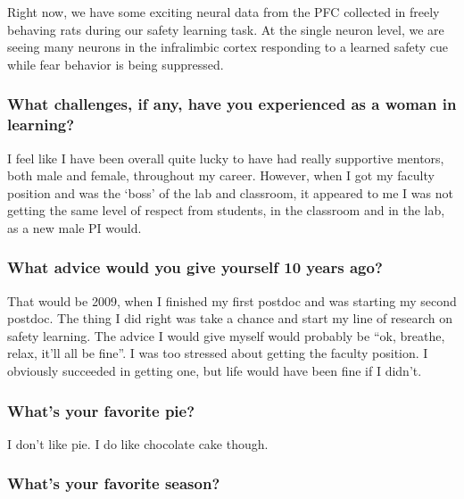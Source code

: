\documentclass[]{article}
\begin{document}
Right now, we have some exciting neural data from the PFC collected in
freely behaving rats during our safety learning task. At the single
neuron level, we are seeing many neurons in the infralimbic cortex
responding to a learned safety cue while fear behavior is being
suppressed.

\subsubsection{\texorpdfstring{\textbf{What challenges, if any, have you
experienced as a woman in
learning?}}{What challenges, if any, have you experienced as a woman in learning?}}\label{what-challenges-if-any-have-you-experienced-as-a-woman-in-learning}

I feel like I have been overall quite lucky to have had really
supportive mentors, both male and female, throughout my career. However,
when I got my faculty position and was the `boss' of the lab and
classroom, it appeared to me I was not getting the same level of respect
from students, in the classroom and in the lab, as a new male PI would.

\subsubsection{\texorpdfstring{\textbf{What advice would you give
yourself 10 years
ago?}}{What advice would you give yourself 10 years ago?}}\label{what-advice-would-you-give-yourself-10-years-ago}

That would be 2009, when I finished my first postdoc and was starting my
second postdoc. The thing I did right was take a chance and start my
line of research on safety learning. The advice I would give myself
would probably be ``ok, breathe, relax, it'll all be fine''. I was too
stressed about getting the faculty position. I obviously succeeded in
getting one, but life would have been fine if I didn't.

\subsubsection{\texorpdfstring{\textbf{What's your favorite
pie?}}{What's your favorite pie?}}\label{whats-your-favorite-pie}

I don't like pie. I do like chocolate cake though.

\subsubsection{\texorpdfstring{\textbf{What's your favorite
season?}}{What's your favorite season?}}\label{whats-your-favorite-season}
\end{document}

